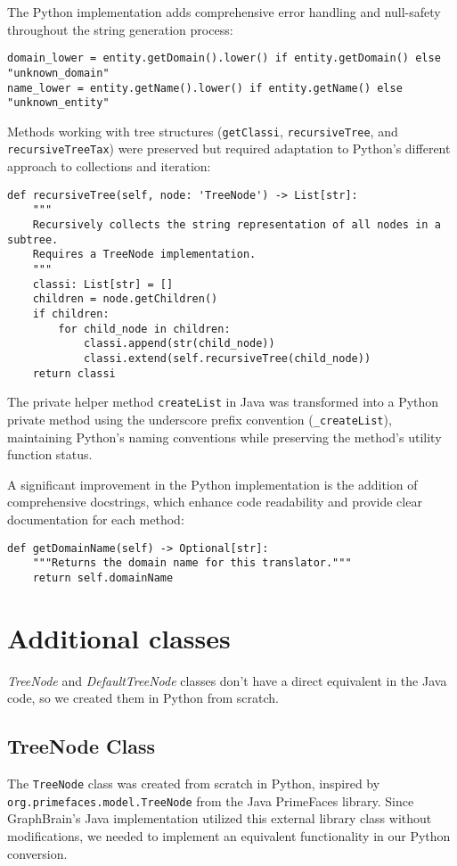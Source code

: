 \documentclass[12pt,a4paper]{article}
\begin{document}
The Python implementation adds comprehensive error handling and null-safety throughout the string generation process:

\begin{verbatim}
domain_lower = entity.getDomain().lower() if entity.getDomain() else "unknown_domain"
name_lower = entity.getName().lower() if entity.getName() else "unknown_entity"
\end{verbatim}

Methods working with tree structures (\texttt{getClassi}, \texttt{recursiveTree}, and \texttt{recursiveTreeTax}) were preserved but required adaptation to Python's different approach to collections and iteration:

\begin{verbatim}
def recursiveTree(self, node: 'TreeNode') -> List[str]:
    """
    Recursively collects the string representation of all nodes in a subtree.
    Requires a TreeNode implementation.
    """
    classi: List[str] = []
    children = node.getChildren()
    if children:
        for child_node in children:
            classi.append(str(child_node))
            classi.extend(self.recursiveTree(child_node))
    return classi
\end{verbatim}

The private helper method \texttt{createList} in Java was transformed into a Python private method using the underscore prefix convention (\texttt{\_createList}), maintaining Python's naming conventions while preserving the method's utility function status.

A significant improvement in the Python implementation is the addition of comprehensive docstrings, which enhance code readability and provide clear documentation for each method:

\begin{verbatim}
def getDomainName(self) -> Optional[str]:
    """Returns the domain name for this translator."""
    return self.domainName
\end{verbatim}

\section{Additional classes}
\textit{TreeNode} and \textit{DefaultTreeNode} classes don't have a direct equivalent in the Java code, so we created them in Python from scratch.

\subsection{TreeNode Class}
The \texttt{TreeNode} class was created from scratch in Python, inspired by \texttt{org.primefaces.model.TreeNode} from the Java PrimeFaces library. Since GraphBrain's Java implementation utilized this external library class without modifications, we needed to implement an equivalent functionality in our Python conversion.
\end{document}
